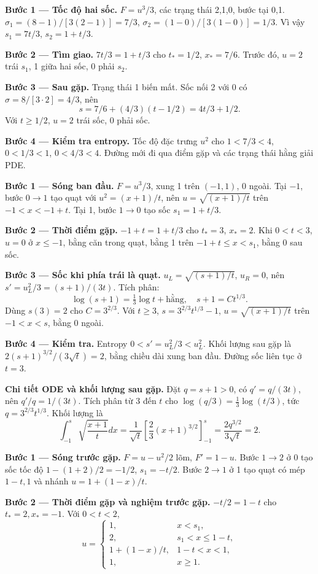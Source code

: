 \textbf{Bước 1 — Tốc độ hai sốc.} $F=u^3/3$, các trạng thái 2,1,0, bước tại 0,1. $\sigma_1=(8-1)/[3(2-1)]=7/3$, $\sigma_2=(1-0)/[3(1-0)]=1/3$. Vì vậy $s_1=7t/3$, $s_2=1+t/3$.

\textbf{Bước 2 — Tìm giao.} $7t/3=1+t/3$ cho $t_*=1/2$, $x_*=7/6$. Trước đó, $u=2$ trái $s_1$, 1 giữa hai sốc, 0 phải $s_2$.

\textbf{Bước 3 — Sau gặp.} Trạng thái 1 biến mất. Sốc nối 2 với 0 có $\sigma=8/[3\cdot2]=4/3$, nên
\[s=7/6+(4/3)(t-1/2)=4t/3+1/2.\]
Với $t\ge1/2$, $u=2$ trái sốc, 0 phải sốc.

\textbf{Bước 4 — Kiểm tra entropy.} Tốc độ đặc trưng $u^2$ cho $1<7/3<4$, $0<1/3<1$, $0<4/3<4$. Đường mới đi qua điểm gặp và các trạng thái hằng giải PDE.

\textbf{Bước 1 — Sóng ban đầu.} $F=u^3/3$, xung 1 trên $(-1,1)$, 0 ngoài. Tại $-1$, bước $0\to1$ tạo quạt với $u^2=(x+1)/t$, nên $u=\sqrt{(x+1)/t}$ trên $-1<x<-1+t$. Tại 1, bước $1\to0$ tạo sốc $s_1=1+t/3$.

\textbf{Bước 2 — Thời điểm gặp.} $-1+t=1+t/3$ cho $t_*=3$, $x_*=2$. Khi $0<t<3$, $u=0$ ở $x\le-1$, bằng căn trong quạt, bằng 1 trên $-1+t\le x<s_1$, bằng 0 sau sốc.

\textbf{Bước 3 — Sốc khi phía trái là quạt.} $u_L=\sqrt{(s+1)/t}$, $u_R=0$, nên $s'=u_L^2/3=(s+1)/(3t)$. Tích phân:
\[\log(s+1)=\tfrac13\log t+\text{hằng},\quad s+1=Ct^{1/3}.\]
Dùng $s(3)=2$ cho $C=3^{2/3}$. Với $t\ge3$, $s=3^{2/3}t^{1/3}-1$, $u=\sqrt{(x+1)/t}$ trên $-1<x<s$, bằng 0 ngoài.

\textbf{Bước 4 — Kiểm tra.} Entropy $0<s'=u_L^2/3<u_L^2$. Khối lượng sau gặp là $2(s+1)^{3/2}/(3\sqrt t)=2$, bằng chiều dài xung ban đầu. Đường sốc liên tục ở $t=3$.

\textbf{Chi tiết ODE và khối lượng sau gặp.} Đặt $q=s+1>0$, có $q'=q/(3t)$, nên $q'/q=1/(3t)$. Tích phân từ $3$ đến $t$ cho $\log(q/3)=\frac13\log(t/3)$, tức $q=3^{2/3}t^{1/3}$. Khối lượng là
\[\int_{-1}^{s}\sqrt{\frac{x+1}{t}}dx
=\frac1{\sqrt t}\left[\frac23(x+1)^{3/2}\right]_{-1}^{s}
=\frac{2q^{3/2}}{3\sqrt t}=2.\]

\textbf{Bước 1 — Sóng trước gặp.} $F=u-u^2/2$ lõm, $F'=1-u$. Bước $1\to2$ ở 0 tạo sốc tốc độ $1-(1+2)/2=-1/2$, $s_1=-t/2$. Bước $2\to1$ ở 1 tạo quạt có mép $1-t,1$ và nhánh $u=1+(1-x)/t$.

\textbf{Bước 2 — Thời điểm gặp và nghiệm trước gặp.} $-t/2=1-t$ cho $t_*=2,x_*=-1$. Với $0<t<2$,
\[u=\begin{cases}1,&x<s_1,\\2,&s_1<x\le1-t,\\1+(1-x)/t,&1-t<x<1,\\1,&x\ge1.\end{cases}\]

